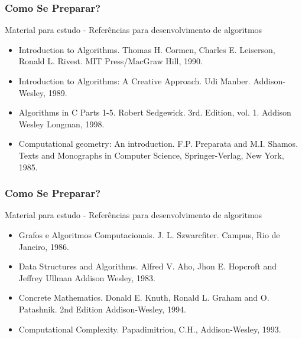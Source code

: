 \begin{frame}
\frametitle{Como Se Preparar?}
\begin{block}{Material para estudo - Referências para desenvolvimento de algoritmos}
\begin{itemize}
	\item Introduction to Algorithms. Thomas H. Cormen, Charles E. Leiserson, Ronald L. Rivest. MIT Press/MacGraw Hill, 1990. 
	\item Introduction to Algorithms: A Creative Approach. Udi Manber. Addison-Wesley, 1989. 
	\item Algorithms in C Parts 1-5. Robert Sedgewick. 3rd. Edition, vol. 1. Addison Wesley Longman, 1998. 
	\item Computational geometry: An introduction. F.P. Preparata and M.I. Shamos. Texts and Monographs in Computer Science, Springer-Verlag, New York, 1985. 
\end{itemize}
\end{block}
\end{frame}

\begin{frame}
\frametitle{Como Se Preparar?}
\begin{block}{Material para estudo - Referências para desenvolvimento de algoritmos}
\begin{itemize}
	\item Grafos e Algoritmos Computacionais. J. L. Szwarcfiter. Campus, Rio de Janeiro, 1986. 
	\item Data Structures and Algorithms. Alfred V. Aho, Jhon E. Hopcroft and Jeffrey Ullman Addison Wesley, 1983. 
	\item Concrete Mathematics. Donald E. Knuth, Ronald L. Graham and O. Patashnik. 2nd Edition Addison-Wesley, 1994. 
	\item Computational Complexity. Papadimitriou, C.H., Addison-Wesley, 1993. 
\end{itemize}
\end{block}
\end{frame}

